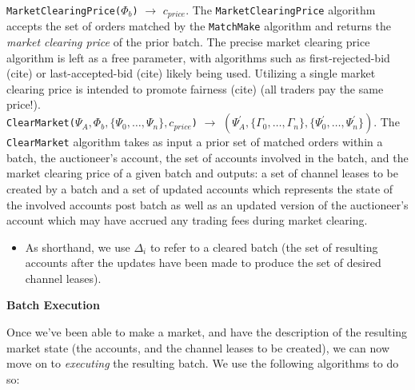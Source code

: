 \documentclass[10pt,a4paper]{article}
\theoremstyle{definition}
\begin{document}


\texttt{MarketClearingPrice($\Phi_b$)} $\rightarrow$ $c_{price}$. The
\texttt{MarketClearingPrice} algorithm accepts the set of orders matched by the
\texttt{MatchMake} algorithm and returns the \emph{market clearing price} of
the prior batch. The precise market clearing price algorithm is left as a free
parameter, with algorithms such as first-rejected-bid (cite) or
last-accepted-bid (cite) likely being used. Utilizing a single market clearing
price is intended to promote fairness (cite) (all traders pay the same price!). \\



\texttt{ClearMarket($\Psi_{A}, \Phi_b, \{\Psi_0, \dots, \Psi_n\}, c_{price}$)}
$\rightarrow$ $(\Psi_{A}^\prime, \{\Gamma_0, \dots, \Gamma_n\},
\{\Psi_{0}^\prime, \dots, \Psi_{n}^\prime\})$. The \texttt{ClearMarket}
algorithm takes as input a prior set of matched orders within a batch, the
auctioneer's account, the set of accounts involved in the batch, and the market
clearing price of a given batch and outputs: a set of channel leases to be
created by a batch and a set of updated accounts which represents the state of
the involved accounts post batch as well as an updated version of the
auctioneer's account which may have accrued any trading fees during market
clearing.


\begin{itemize}
    \item As shorthand, we use $\Delta_i$ to refer to a cleared batch (the set of
            resulting accounts after the updates have been made to produce the
            set of desired channel leases).
\end{itemize}


\begin{center}
    \textbf{Batch Execution}
\end{center}

Once we've been able to make a market, and have the description of the
resulting market state (the accounts, and the channel leases to be created), we
can now move on to \emph{executing} the resulting batch. We use the following
algorithms to do so:  \\
\end{document}
